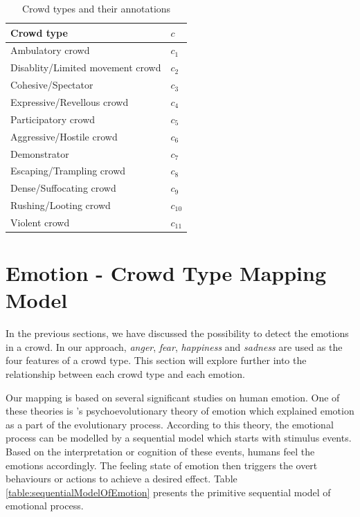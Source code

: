 \begin{table}
\caption{Crowd types and their annotations}
\label{table:crowdTypeAnnotation}
\centering
\begin{tabular}{|l|l|}
\hline
\textbf{Crowd type} & \textbf{\(c\)} \\ \hline \hline
Ambulatory crowd & \(c_1\) \\ \hline
Disablity/Limited movement crowd & \(c_2\) \\ \hline
Cohesive/Spectator & \(c_3\) \\ \hline
Expressive/Revellous crowd & \(c_4\) \\ \hline
Participatory crowd & \(c_5\) \\ \hline
Aggressive/Hostile crowd & \(c_6\) \\ \hline
Demonstrator & \(c_7\) \\ \hline
Escaping/Trampling crowd & \(c_8\) \\ \hline
Dense/Suffocating crowd & \(c_9\) \\ \hline
Rushing/Looting crowd & \(c_{10}\) \\ \hline
Violent crowd & \(c_{11}\) \\ \hline
\end{tabular}
\end{table}

\section{Emotion - Crowd Type Mapping Model}
In the previous sections, we have discussed the possibility to detect the emotions in a crowd. In our approach, \textit{anger}, \textit{fear}, \textit{happiness} and \textit{sadness} are used as the four features of a crowd type. This section will explore further into the relationship between each crowd type and each emotion. 

Our mapping is based on several significant studies on human emotion. One of these theories is \citet{Plutchik1980}'s psychoevolutionary theory of emotion which explained emotion as a part of the evolutionary process. According to this theory, the emotional process can be modelled by a sequential model which starts with stimulus events. Based on the interpretation or cognition of these events, humans feel the emotions accordingly. The feeling state of emotion then triggers the overt behaviours or actions to achieve a desired effect. Table \ref{table:sequentialModelOfEmotion} presents the primitive sequential model of emotional process.

